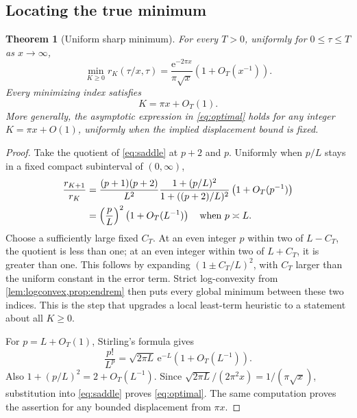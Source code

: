 \documentclass[11pt,a4paper]{article}
\newtheorem{theorem}{Theorem}[section]
\theoremstyle{definition}
\theoremstyle{remark}
\newcommand{\e}{\mathrm e}
\begin{document}
\subsection{Locating the true minimum}
\begin{theorem}[Uniform sharp minimum]
\label{thm:optimal}
For every $T>0$, uniformly for $0\le\tau\le T$ as $x\to\infty$,
\begin{equation}
 \boxed{\displaystyle
 \min_{K\ge0}r_K(\tau/x,\tau)
 =\frac{\e^{-2\pi x}}{\pi\sqrt{x}}
       \left(1+O_T(x^{-1})\right).}
 \label{eq:optimal}
\end{equation}
Every minimizing index satisfies
\begin{equation}
 K=\pi x+O_T(1).
 \label{eq:optimalK}
\end{equation}
More generally, the asymptotic expression in \eqref{eq:optimal} holds
for any integer $K=\pi x+O(1)$, uniformly when the implied displacement
bound is fixed.
\end{theorem}
\begin{proof}
Take the quotient of \eqref{eq:saddle} at $p+2$ and $p$. Uniformly when
$p/L$ stays in a fixed compact subinterval of $(0,\infty)$,
\begin{align}
 \frac{r_{K+1}}{r_K}
 &=\frac{(p+1)(p+2)}{L^2}
   \frac{1+(p/L)^2}{1+((p+2)/L)^2}
   \left(1+O_T(p^{-1})\right)\notag\\
 &=\left(\frac pL\right)^2\left(1+O_T(L^{-1})\right)
 \quad\text{when }p\asymp L.
 \label{eq:quotient}
\end{align}
Choose a sufficiently large fixed $C_T$. At an even integer $p$ within
two of $L-C_T$, the quotient is less than one; at an even integer within
two of $L+C_T$, it is greater than one. This follows by expanding
$(1\pm C_T/L)^2$, with $C_T$ larger than the uniform constant in the error
term. Strict log-convexity from \cref{lem:logconvex,prop:endrem} then puts
every global minimum between these two indices. This is the step that
upgrades a local least-term heuristic to a statement about all $K\ge0$.

For $p=L+O_T(1)$, Stirling's formula gives
\begin{equation}
 \frac{p!}{L^p}=\sqrt{2\pi L}\,\e^{-L}
                 \left(1+O_T(L^{-1})\right).
 \label{eq:stirlingsaddle}
\end{equation}
Also $1+(p/L)^2=2+O_T(L^{-1})$. Since
$\sqrt{2\pi L}/(2\pi^2x)=1/(\pi\sqrt{x})$, substitution into
\eqref{eq:saddle} proves \eqref{eq:optimal}. The same computation proves
the assertion for any bounded displacement from $\pi x$.
\end{proof}
\end{document}
